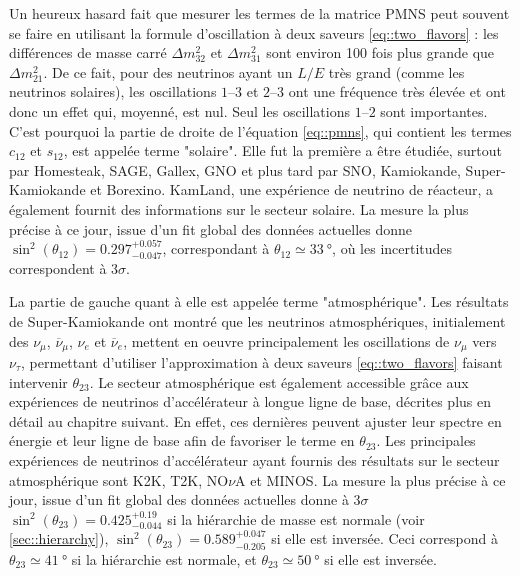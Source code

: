             Un heureux hasard fait que mesurer les termes de la matrice PMNS peut souvent se faire en utilisant la formule d'oscillation à deux saveurs \eqref{eq::two_flavors} : les différences de masse carré $\Delta m_{32}^2$ et $\Delta m_{31}^2$ sont environ 100 fois plus grande que $\Delta m_{21}^2$. De ce fait, pour des neutrinos ayant un $L/E$ très grand (comme les neutrinos solaires), les oscillations $1$--$3$ et $2$--$3$ ont une fréquence très élevée et ont donc un effet qui, moyenné, est nul. Seul les oscillations $1$--$2$ sont importantes. C'est pourquoi la partie de droite de l'équation \eqref{eq::pmns}, qui contient les termes $c_{12}$ et $s_{12}$, est appelée terme "solaire". Elle fut la première a être étudiée, surtout par Homesteak\cite{ref_needed}, SAGE\cite{ref_needed}, Gallex\cite{ref_needed}, GNO\cite{ref_needed} et plus tard par SNO\cite{Aharmim2013},  Kamiokande\cite{ref_needed}, Super-Kamiokande\cite{ref_needed} et Borexino\cite{ref_needed}. KamLand\cite{ref_needed}, une expérience de neutrino de réacteur, a également fournit des informations sur le secteur solaire. La mesure la plus précise à ce jour, issue d'un fit global des données actuelles donne $\sin^2(\theta_{12})=0.297^{+0.057}_{-0.047}$\cite{pdg2018}, correspondant à $\theta_{12}\simeq\SI{33}{\degree}$, où les incertitudes correspondent à $3\sigma$.
            
            La partie de gauche quant à elle est appelée terme "atmosphérique". Les résultats de Super-Kamiokande\cite{Fukuda1998} ont montré que les neutrinos atmosphériques, initialement des $\nu_{\mu}$, $\overline{\nu}_{\mu}$, $\nu_e$ et $\overline{\nu}_e$, mettent en oeuvre principalement les oscillations de $\nu_{\mu}$ vers $\nu_{\tau}$, permettant d'utiliser l'approximation à deux saveurs \eqref{eq::two_flavors} faisant intervenir $\theta_{23}$. Le secteur atmosphérique est également accessible grâce aux expériences de neutrinos d'accélérateur à longue ligne de base, décrites plus en détail au chapitre suivant. En effet, ces dernières peuvent ajuster leur spectre en énergie et leur ligne de base afin de favoriser le terme en $\theta_{23}$. Les principales expériences de neutrinos d'accélérateur ayant fournis des résultats sur le secteur atmosphérique sont K2K\cite{ref_needed}, T2K\cite{ref_needed}, NO$\nu$A\cite{ref_needed} et MINOS\cite{ref_needed}. La mesure la plus précise à ce jour, issue d'un fit global des données actuelles donne à $3\sigma$ $\sin^2(\theta_{23})=0.425^{+0.19}_{-0.044}$\cite{pdg2018} si la hiérarchie de masse est normale (voir \autoref{sec::hierarchy}), $\sin^2(\theta_{23})=0.589^{+0.047}_{-0.205}$ si elle est inversée. Ceci correspond à $\theta_{23}\simeq\SI{41}{\degree}$ si la hiérarchie est normale, et $\theta_{23}\simeq\SI{50}{\degree}$ si elle est inversée.
            
